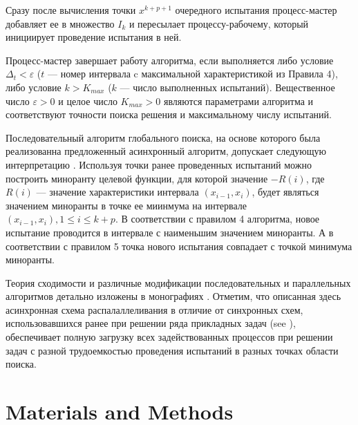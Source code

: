 \documentclass[mathematics,article,submit,pdftex,moreauthors]{Definitions/mdpi}
\begin{document}
Сразу после вычисления точки $x^{k+p+1}$ очередного испытания процесс-мастер добавляет ее в множество $I_k$ и пересылает процессу-рабочему, который инициирует проведение испытания в ней. 

Процесс-мастер завершает работу алгоритма, если выполняется либо условие $\Delta_{t}<\varepsilon$ ($t$ --- номер интервала c максимальной характеристикой из Правила 4), либо условие $k>K_{max}$ ($k$ --- число выполненных испытаний).
Вещественное число $\varepsilon>0$ и целое число $K_{max}>0$ являются параметрами алгоритма и соответствуют точности поиска решения и максимальному числу испытаний.

Последовательный алгоритм глобального поиска, на основе которого была реализованна предложенный асинхронный алгоритм, допускает следующую интерпретацию \cite{Molinaro2001}. Используя точки ранее проведенных испытаний можно построить миноранту целевой функции, для которой значение $-R(i)$, где $R(i)$ --- значение характеристики интервала $(x_{i-1},x_i)$, будет являться значением миноранты в точке ее миинмума на интервале $(x_{i-1},x_i), 1\leq i\leq k+p$. В соответствии с правилом 4 алгоритма, новое испытание проводится в интервале с наименьшим значением миноранты. А в соответствии с правилом 5 точка нового испытания совпадает с точкой минимума миноранты.

Теория сходимости и различные модификации последовательных и параллельных алгоритмов детально изложены в монографиях \cite{Strongin2000,Sergeyev2017}. 
Отметим, что описанная здесь асинхронная схема распалаллеливания в отличие от синхронных схем, использовавшихся ранее при решении ряда прикладных задач (see \cite{Kalyulin2017,Modorskii2016}), обеспечивает полную загрузку всех задействованных процессов при решении задач с разной трудоемкостью проведения испытаний в разных точках области поиска.







\section{Materials and Methods}
\end{document}
